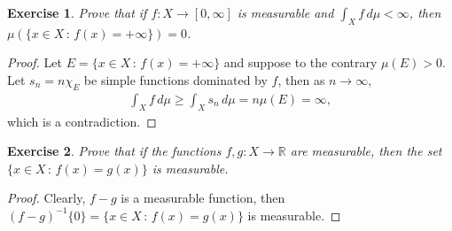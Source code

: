 \documentclass[11pt]{book}
\newtheorem{exercise}{Exercise}[chapter]
\theoremstyle{definition}
\numberwithin{equation}{chapter}
\begin{document}
\medskip

\begin{exercise}
Prove that if $f:X\to [0,\infty]$ is measurable and $\int_Xf\,d\mu<\infty$, then
$\mu(\{x \in X \,:\, f(x) = +\infty\})=0$.
\end{exercise}
\begin{proof} 
Let $E = \{x \in X \,:\, f(x)=+\infty\}$ and suppose to the contrary $\mu(E) > 0$. Let $s_n = n \chi_E$ be simple functions dominated by $f$, then as $n \to \infty$,
\begin{align*}
    \int_X f\,d\mu \geq \int_X s_n\,d\mu = n \mu(E) = \infty,
\end{align*}
which is a contradiction.
\end{proof}

\medskip

\begin{exercise}
Prove that if the functions $f,g:X\to \mathbb{R}$ are
measurable, then the set $\{x \in X \,:\, f(x)=g(x)\}$ is measurable.
\end{exercise}
\begin{proof}
Clearly, $f - g$ is a measurable function, then $(f - g)^{-1}\{0\} = \{x \in X \,:\, f(x)=g(x)\}$ is measurable.
\end{proof}

\medskip
\end{document}
